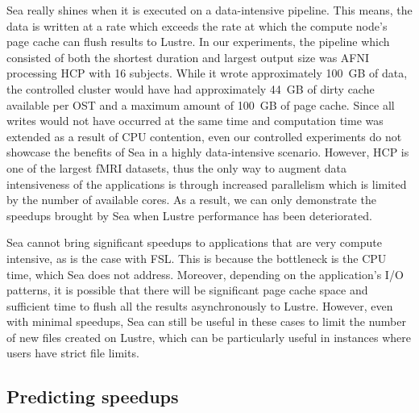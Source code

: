     Sea really shines when it is executed on a data-intensive pipeline. This
    means, the data is written at a rate which exceeds the rate at which the
    compute node's page cache can flush results to Lustre. In our experiments,
    the pipeline which consisted of both the shortest duration and largest
    output size was AFNI processing HCP with 16 subjects. While it wrote
    approximately 100~GB of data, the controlled cluster would have had
    approximately 44~GB of dirty cache available per OST and a maximum amount of
    100~GB of page cache. Since all writes would not have occurred at the same
    time and computation time was extended as a result of CPU contention, even
    our controlled experiments do not showcase the benefits of Sea in a highly
    data-intensive scenario. However, HCP is one of the largest fMRI datasets,
    thus the only way to augment data intensiveness of the applications is
    through increased parallelism which is limited by the number of available
    cores. As a result, we can only demonstrate the speedups brought by Sea when
    Lustre performance has been deteriorated.


    Sea cannot bring significant speedups to applications that are very compute intensive,
    as is the case with FSL. This is because the bottleneck is the CPU time, which Sea
    does not address. Moreover, depending on the application's I/O patterns, it is possible
    that there will be significant page cache space and sufficient time to flush all the
    results asynchronously to Lustre. However, even with minimal speedups, Sea can still be
    useful in these cases to limit the number of new files created on Lustre, which can be particularly
    useful in instances where users have strict file limits.


    \subsection{Predicting speedups}


